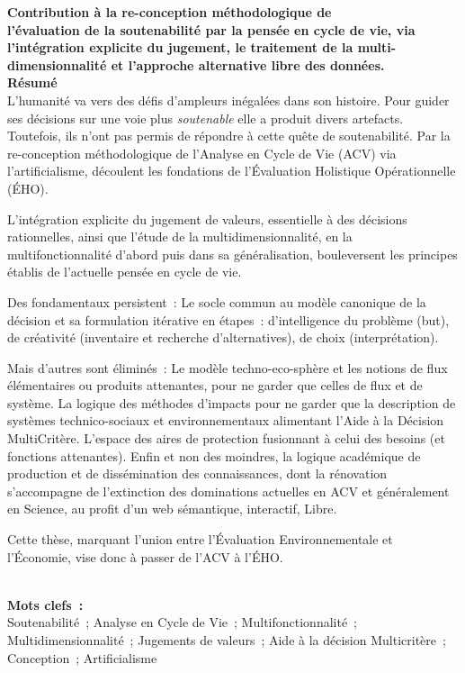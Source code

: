 {\large \bfseries
Contribution à la re-conception méthodologique de\\l'évaluation de la soutenabilité par la pensée en cycle de vie, via l'intégration explicite du jugement, le traitement de la multi-dimensionnalité et l'approche alternative libre des données.
}
~\\

\textbf{Résumé}\\
L'humanité va vers des défis d'ampleurs inégalées dans son histoire.
Pour guider ses décisions sur une voie plus \emph{soutenable} elle a produit divers artefacts.
Toutefois, ils n'ont pas permis de répondre à cette quête de soutenabilité.
Par la re-conception méthodologique de l'Analyse en Cycle de Vie (ACV) via l'artificialisme, découlent les fondations de l'Évaluation Holistique Opérationnelle (ÉHO).

L'intégration explicite du jugement de valeurs, essentielle à des décisions rationnelles, ainsi que l'étude de la multidimensionnalité, en la multifonctionnalité d'abord puis dans sa généralisation, bouleversent les principes établis de l'actuelle pensée en cycle de vie.

Des fondamentaux persistent~:
Le socle commun au modèle canonique de la décision et sa formulation itérative en étapes~: d'intelligence du problème (but), de créativité (inventaire et recherche d'alternatives), de choix (interprétation).

Mais d'autres sont éliminés~:
Le modèle techno-eco-sphère et les notions de flux élémentaires ou produits attenantes, pour ne garder que celles de flux et de système.
La logique des méthodes d'impacts pour ne garder que la description de systèmes technico-sociaux et environnementaux alimentant l'Aide à la Décision MultiCritère.
L'espace des aires de protection fusionnant à celui des besoins (et fonctions attenantes).
Enfin et non des moindres, la logique académique de production et de dissémination des connaissances, dont la rénovation s'accompagne de l'extinction des dominations actuelles en ACV et généralement en Science, au profit d'un web sémantique, interactif, Libre.

Cette thèse, marquant l'union entre l'Évaluation Environnementale et l'Économie, vise donc à passer de l'ACV à l'ÉHO.

~\\
\textbf{Mots clefs~:}\\
Soutenabilité~; Analyse en Cycle de Vie~; Multifonctionnalité~; Multidimensionnalité~; Jugements de valeurs~; Aide à la décision Multicritère~; Conception~; Artificialisme
\newpage
